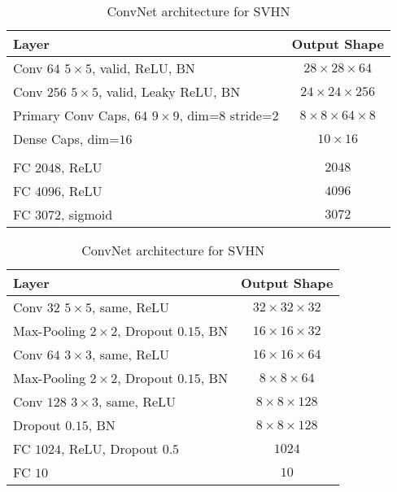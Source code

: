 \begin{table}
	\centering
	
	\begin{tabular}{lc}
		\toprule 
		Layer	& Output Shape \\ 
		\midrule 
		Conv $64$ $5\times5$, valid, ReLU, BN	&  $28\times28\times64$ \\ 
		\midrule 
		Conv $256$ $5\times5$, valid, Leaky ReLU, BN	&  $24\times24\times256$\\ 
		\midrule 
		Primary Conv Caps, $64$ $9\times9$, dim=$8$	stride=$2$ &  $8\times8\times64\times8$\\ 
		\midrule 
		Dense Caps, dim=$16$	&  $10\times16$\\ 
		\midrule
		& \\
		\midrule
		FC $2048$, ReLU	& $2048$ \\
		\midrule
		FC $4096$, ReLU	& $4096$ \\
		\midrule
		FC $3072$, sigmoid	& $3072$\\
		\bottomrule
	\end{tabular}
	\caption{CapsNet architecture for SVHN}
	\label{tab:capsnet:svhn}
	
	\vspace{0.75cm}
	
	\begin{tabular}{lc}
		\toprule 
		Layer	&  Output Shape \\ 
		\midrule 
		Conv $32$ $5\times5$, same,	ReLU & $32\times32\times32$ \\ 
		\midrule 
		Max-Pooling $2\times2$, Dropout $0.15$, BN	&  $16\times16\times32$ \\ 
		\midrule 
		Conv $64$ $3\times3$, same, ReLU	& $16\times16\times64$ \\ 
		\midrule 
		Max-Pooling $2\times2$, Dropout $0.15$, BN	& $8\times8\times64$ \\
		\midrule
		Conv $128$ $3\times3$, same, ReLU	& $8\times8\times128$ \\
		\midrule
		Dropout $0.15$, BN	& $8\times8\times128$ \\
		\midrule
		FC $1024$, ReLU, Dropout $0.5$ & $1024$ \\
		\midrule
		FC $10$ & $10$\\
		\bottomrule
	\end{tabular}
	\caption{ConvNet architecture for SVHN}
	\label{tab:convnet:svhn}
\end{table}


